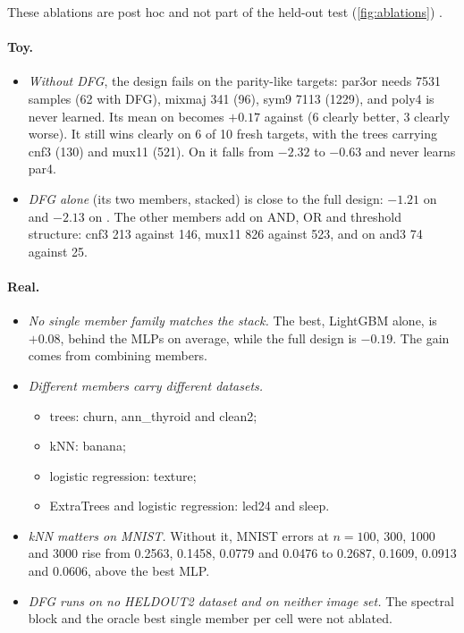 These ablations are post hoc and not part of the held-out test (\cref{fig:ablations}) .

\paragraph{Toy.}
\begin{itemize}
\item \emph{Without DFG}, the design fails on the parity-like targets: par3or needs 7531 samples (62 with DFG), mixmaj 341 (96), sym9 7113 (1229), and poly4 is never learned. Its mean on  becomes $+0.17$ against  (6 clearly better, 3 clearly worse). It still wins clearly on 6 of 10 fresh targets, with the trees carrying cnf3 (130) and mux11 (521). On  it falls from $-2.32$ to $-0.63$ and never learns par4.
\item \emph{DFG alone} (its two members, stacked) is close to the full design: $-1.21$ on  and $-2.13$ on . The other members add on AND, OR and threshold structure: cnf3 213 against 146, mux11 826 against 523, and on  and3 74 against 25.
\end{itemize}

\paragraph{Real.}
\begin{itemize}
\item \emph{No single member family matches the stack.} The best, LightGBM alone, is $+0.08$, behind the MLPs on average, while the full design is $-0.19$. The gain comes from combining members.
\item \emph{Different members carry different datasets.}
  \begin{itemize}
  \item trees: churn, ann\_thyroid and clean2;
  \item kNN: banana;
  \item logistic regression: texture;
  \item ExtraTrees and logistic regression: led24 and sleep.
  \end{itemize}
\item \emph{kNN matters on MNIST.} Without it, MNIST errors at $n=100$, 300, 1000 and 3000 rise from 0.2563, 0.1458, 0.0779 and 0.0476 to 0.2687, 0.1609, 0.0913 and 0.0606, above the best MLP.
\item \emph{DFG runs on no HELDOUT2 dataset and on neither image set.} The spectral block and the oracle best single member per cell were not ablated.
\end{itemize}

